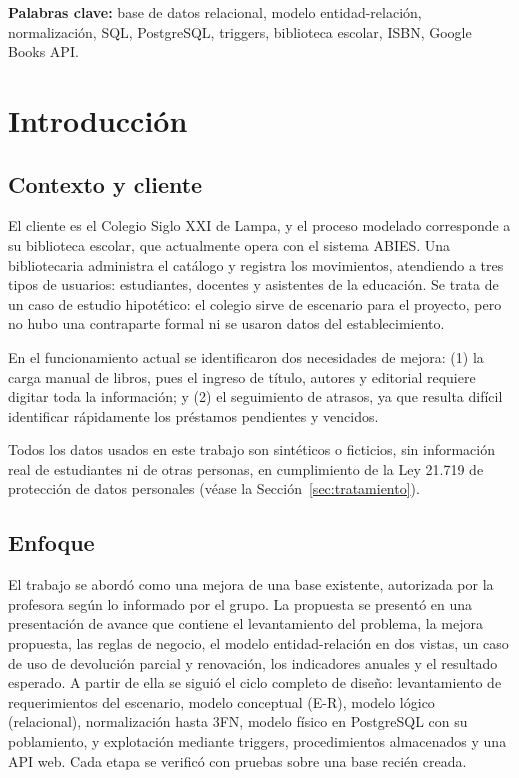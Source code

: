 \documentclass[11pt,a4paper]{article}
\begin{document}
\textbf{Palabras clave:} base de datos relacional, modelo entidad-relación, normalización, SQL, PostgreSQL, triggers, biblioteca escolar, ISBN, Google Books API.

\section{Introducción}

\subsection{Contexto y cliente}
El cliente es el Colegio Siglo XXI de Lampa, y el proceso modelado corresponde a su biblioteca escolar, que actualmente opera con el sistema ABIES. Una bibliotecaria administra el catálogo y registra los movimientos, atendiendo a tres tipos de usuarios: estudiantes, docentes y asistentes de la educación. Se trata de un caso de estudio hipotético: el colegio sirve de escenario para el proyecto, pero no hubo una contraparte formal ni se usaron datos del establecimiento.

En el funcionamiento actual se identificaron dos necesidades de mejora: (1) la carga manual de libros, pues el ingreso de título, autores y editorial requiere digitar toda la información; y (2) el seguimiento de atrasos, ya que resulta difícil identificar rápidamente los préstamos pendientes y vencidos.

Todos los datos usados en este trabajo son sintéticos o ficticios, sin información real de estudiantes ni de otras personas, en cumplimiento de la Ley 21.719 de protección de datos personales (véase la Sección~\ref{sec:tratamiento}).

\subsection{Enfoque}
El trabajo se abordó como una mejora de una base existente, autorizada por la profesora según lo informado por el grupo. La propuesta se presentó en una presentación de avance que contiene el levantamiento del problema, la mejora propuesta, las reglas de negocio, el modelo entidad-relación en dos vistas, un caso de uso de devolución parcial y renovación, los indicadores anuales y el resultado esperado. A partir de ella se siguió el ciclo completo de diseño: levantamiento de requerimientos del escenario, modelo conceptual (E-R), modelo lógico (relacional), normalización hasta 3FN, modelo físico en PostgreSQL con su poblamiento, y explotación mediante triggers, procedimientos almacenados y una API web. Cada etapa se verificó con pruebas sobre una base recién creada.
\end{document}
